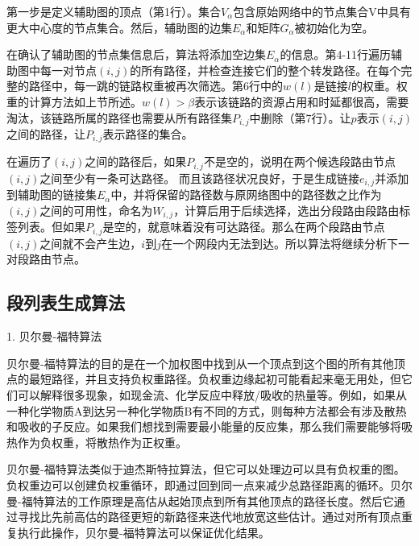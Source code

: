 第一步是定义辅助图的顶点（第1行）。集合$V_\alpha$包含原始网络中的节点集合V中具有更大中心度的节点集合。然后，辅助图的边集$E_\alpha$和矩阵$G_\alpha$被初始化为空。

在确认了辅助图的节点集信息后，算法将添加空边集$E_\alpha$的信息。第4-11行遍历辅助图中每一对节点$\left(i,j\right)$的所有路径，并检查连接它们的整个转发路径。在每个完整的路径中，每一跳的链路权重被再次筛选。第6行中的$w\left(l\right)$是链接$l$的权重。权重的计算方法如上节所述。$w\left(l\right)>\beta$表示该链路的资源占用和时延都很高，需要淘汰，该链路所属的路径也需要从所有路径集$P_{i,j}$中删除（第7行）。让$p$表示$\left(i,j\right)$之间的路径，让$P_{i,j}$表示路径的集合。

在遍历了$\left(i,j\right)$之间的路径后，如果$P_{i,j}$不是空的，说明在两个候选段路由节点$\left(i,j\right)$之间至少有一条可达路径。 而且该路径状况良好，于是生成链接$e_{i,j}$并添加到辅助图的链接集$E_\alpha$中，并将保留的路径数与原网络图中的路径数之比作为$\left(i,j\right)$之间的可用性，命名为$W_{i,j}$，计算后用于后续选择，选出分段路由段路由标签列表。但如果$P_{i,j}$是空的，就意味着没有可达路径。那么在两个段路由节点$\left(i,j\right)$之间就不会产生边，$i$到$j$在一个网段内无法到达。所以算法将继续分析下一对段路由节点。

\subsection{段列表生成算法}

1. 贝尔曼-福特算法

贝尔曼-福特算法的目的是在一个加权图中找到从一个顶点到这个图的所有其他顶点的最短路径，并且支持负权重路径。负权重边缘起初可能看起来毫无用处，但它们可以解释很多现象，如现金流、化学反应中释放/吸收的热量等。例如，如果从一种化学物质A到达另一种化学物质B有不同的方式，则每种方法都会有涉及散热和吸收的子反应。如果我们想找到需要最小能量的反应集，那么我们需要能够将吸热作为负权重，将散热作为正权重。

贝尔曼-福特算法类似于迪杰斯特拉算法，但它可以处理边可以具有负权重的图。负权重边可以创建负权重循环，即通过回到同一点来减少总路径距离的循环。贝尔曼-福特算法的工作原理是高估从起始顶点到所有其他顶点的路径长度。然后它通过寻找比先前高估的路径更短的新路径来迭代地放宽这些估计。通过对所有顶点重复执行此操作，贝尔曼-福特算法可以保证优化结果。

